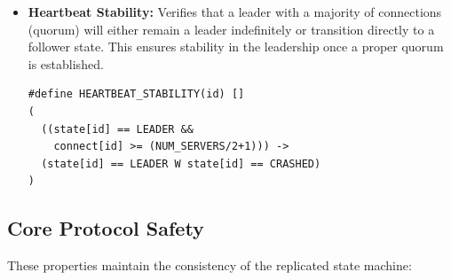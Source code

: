 \documentclass[a4paper]{llncs}
\begin{document}
\begin{itemize}
    \item \textbf{Heartbeat Stability:} \label{prop:heartbeat_stability} Verifies that a leader with a majority of connections (quorum) will either remain a leader indefinitely or transition directly to a follower state. This ensures stability in the leadership once a proper quorum is established.
    
    \begin{lstlisting}[style=promela, caption={LTL Formula for Heartbeat Stability}, label={lst:ltl_heartbeat_stability}]
#define HEARTBEAT_STABILITY(id) []
(
  ((state[id] == LEADER && 
    connect[id] >= (NUM_SERVERS/2+1))) -> 
  (state[id] == LEADER W state[id] == CRASHED)
)
    \end{lstlisting}
\end{itemize}

\subsection{Core Protocol Safety}

These properties maintain the consistency of the replicated state machine:
\end{document}
